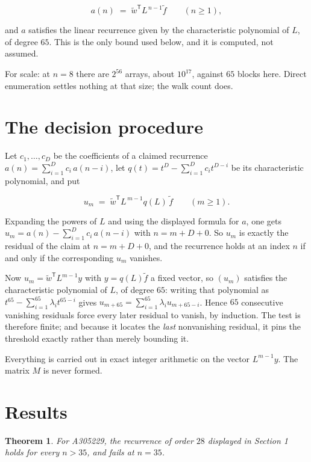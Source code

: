 \documentclass[11pt]{article}
\newtheorem{theorem}{Theorem}
\theoremstyle{definition}
\begin{document}
\[a(n) \;=\; \tilde w^{\mathsf T} L^{\,n-1} \tilde f \qquad (n \ge 1),\]

and $a$ satisfies the linear recurrence given by the characteristic polynomial of $L$, of degree $65$. This is the only bound used below, and it is computed, not assumed.

For scale: at $n = 8$ there are $2^{56}$ arrays, about $10^{17}$, against $65$ blocks here. Direct enumeration settles nothing at that size; the walk count does.

\section{The decision procedure}

Let $c_1,\dots,c_D$ be the coefficients of a claimed recurrence $a(n) = \sum_{i=1}^{D} c_i\,a(n-i)$, let $q(t) = t^{D} - \sum_{i=1}^{D} c_i t^{D-i}$ be its characteristic polynomial, and put

\[u_m \;=\; \tilde w^{\mathsf T} L^{\,m-1} q(L)\,\tilde f \qquad (m \ge 1).\]

Expanding the powers of $L$ and using the displayed formula for $a$, one gets $u_m = a(n) - \sum_{i=1}^{D} c_i\,a(n-i)$ with $n = m + D + 0$. So $u_m$ is exactly the residual of the claim at $n = m + D + 0$, and the recurrence holds at an index $n$ if and only if the corresponding $u_m$ vanishes.

Now $u_m = \tilde w^{\mathsf T} L^{m-1} y$ with $y = q(L)\tilde f$ a fixed vector, so $(u_m)$ satisfies the characteristic polynomial of $L$, of degree $65$: writing that polynomial as $t^{65} - \sum_{i=1}^{65} \lambda_i t^{65-i}$ gives $u_{m+65} = \sum_{i=1}^{65} \lambda_i u_{m+65-i}$. Hence $65$ consecutive vanishing residuals force every later residual to vanish, by induction. The test is therefore finite; and because it locates the {\itshape last} nonvanishing residual, it pins the threshold exactly rather than merely bounding it.

Everything is carried out in exact integer arithmetic on the vector $L^{m-1}y$. The matrix $M$ is never formed.

\section{Results}

\begin{theorem} For A305229, the recurrence of order $28$ displayed in Section 1 holds for every $n > 35$, and fails at $n = 35$.\end{theorem}
\end{document}

